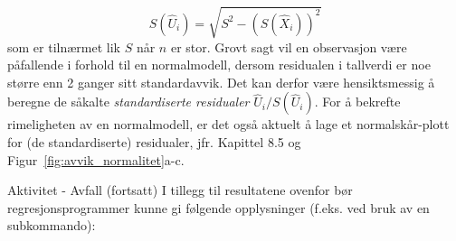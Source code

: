 \[   S(\hat U_i)=\sqrt {S^2-(S(\hat X_i))^2}\]
som er tilnærmet lik $S$ når $n$ er stor. 
Grovt sagt vil en observasjon være påfallende i forhold
til en normalmodell, dersom residualen i tallverdi er noe større
enn 2 ganger sitt standardavvik. Det kan derfor være hensiktsmessig
å beregne de såkalte {\em standardiserte residualer} $\hat U_i/S(\hat U_i)$.
For å bekrefte rimeligheten av en normalmodell, er det
også aktuelt å lage et normalskår-plott for (de
standardiserte) residualer, jfr. Kapittel 8.5 og Figur~\ref{fig:avvik_normalitet}a-c.\\

\addtocounter{eksecount}{-1}
\begin{eksempel}{Aktivitet - Avfall (fortsatt)}
I tillegg til resultatene ovenfor bør regresjonsprogrammer
kunne gi følgende opplysninger (f.eks. ved bruk av en subkommando):\\

\begin{center} 
\end{center}
\end{eksempel}
